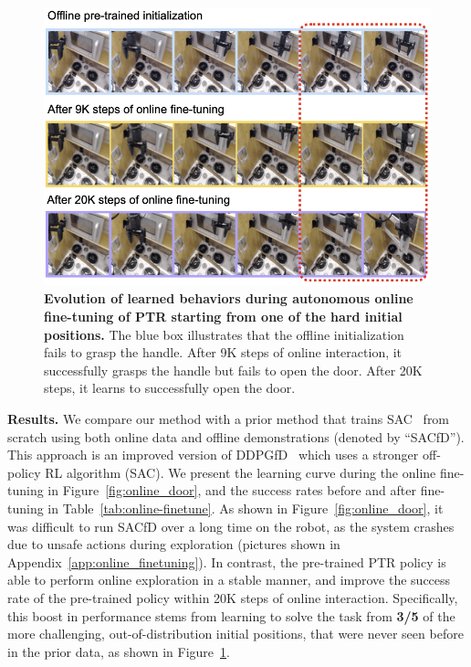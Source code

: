 \begin{figure}
\vspace{-0.4cm}
\centering
\includegraphics[width=0.78\linewidth]{chapters/ptr/online_improvement.png}
\vspace{-0.24cm}
\caption{\footnotesize{\label{fig:online-improvement} \textbf{Evolution of learned behaviors during autonomous online fine-tuning of PTR starting from one of the hard initial positions.} The blue box illustrates that the offline initialization fails to grasp the handle. After 9K steps of online interaction, it successfully grasps the handle but fails to open the door. After 20K steps, it learns to successfully open the door.}}
\vspace{-0.4cm}
\end{figure}

\textbf{Results.} We compare our method with a prior method that trains SAC~\citep{haarnoja2018soft} from scratch using both online data and offline demonstrations (denoted by ``SACfD''). This approach is an improved version of DDPGfD~\citep{vecerik2017leveraging} which uses a stronger off-policy RL algorithm (SAC). We present the learning curve during the online fine-tuning in Figure~\ref{fig:online_door}, and the success rates before and after fine-tuning in Table~\ref{tab:online-finetune}. As shown in Figure~\ref{fig:online_door}, it was difficult to run SACfD over a long time on the robot, as the system crashes due to unsafe actions during exploration (pictures shown in Appendix~\ref{app:online_finetuning}). In contrast, the pre-trained PTR policy is able to perform online exploration in a stable manner, and improve the success rate of the pre-trained policy within 20K steps of online interaction. Specifically, this boost in performance stems from learning to solve the task from \textbf{3/5} of the more challenging, out-of-distribution initial positions, that were never seen before in the prior data, as shown in Figure~\ref{fig:online-improvement}. 
